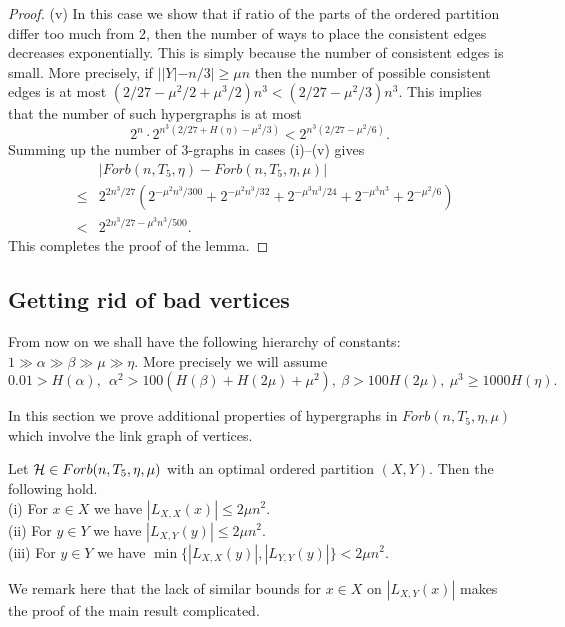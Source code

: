 \documentclass[11pt]{article}
\begin{document}
\begin{proof}
(v) In this case we show that if ratio of the parts of the ordered partition differ too
much from  2, then the number of ways to place the consistent edges
decreases exponentially.  This is simply because the number of consistent edges is small. More precisely,
 if $||Y|-n/3|\ge \mu n$ then the number of possible consistent edges is
at most $(2/27-\mu^2/2+\mu^3/2)n^3<(2/27-\mu^2/3)n^3$. This implies that the number of such hypergraphs is at most
$$2^n\cdot 2^{n^3(2/27+H(\eta)-\mu^2/3)}<2^{n^3(2/27-\mu^2/6)}.$$
Summing up the number of 3-graphs  in cases (i)--(v) gives
\begin{eqnarray*}& & |Forb(n,T_5,\eta)-Forb(n,T_5,\eta,\mu)| \\
&\le& 2^{2n^3/27} \left(2^{-\mu^2n^3/300}+  2^{-\mu^2n^3/32}
+2^{-\mu^3 n^3/24} +2^{-\mu^3 n^3}+2^{-\mu^2/6}\right)\\ &<&
2^{2n^3/27 -\mu^3n^3/500}.\end{eqnarray*}
This completes the proof of the lemma.
\end{proof}


\subsection{Getting rid of bad vertices}\label{subbadvert}

From now on we shall have the following hierarchy of constants:
$1\gg \alpha\gg \beta\gg \mu\gg \eta$. More precisely we will assume
\begin{equation}\label{parameters} 0.01>H(\alpha),\  \ \alpha^2
>100( H(\beta)+H(2\mu)+\mu ^2),\ \beta> 100H(2\mu),\ \mu^3\ge 1000
H(\eta).\end{equation}

In this section we prove additional properties of hypergraphs in
$Forb(n,T_5,\eta,\mu)$ which involve the link graph of vertices.



\begin{lemma}\label{badvertices}
Let $\mathcal{H}\in Forb(n,T_5,\eta,\mu)$ with an  optimal ordered partition
$(X,Y)$.
Then the following hold.\\
(i) For $x\in X$ we have $|L_{X,X}(x)|\le 2\mu n^2.$\\
(ii) For $y\in Y$ we have $|L_{X,Y}(y)|\le 2\mu n^2.$\\
(iii) For $y\in Y$ we have $\min\{|L_{X,X}(y)|,|L_{Y,Y}(y)|\}< 2\mu
n^2.$
\end{lemma}


We remark here  that the lack of similar bounds for $x\in X$ on $|L_{X,Y}(x)|$ makes
the proof of the main result  complicated.
\end{document}
